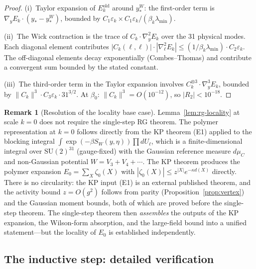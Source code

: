 \documentclass[11pt]{article}
\theoremstyle{definition}
\newtheorem{remark}[theorem]{Remark}
\newcommand{\SU}{\mathrm{SU}}
\begin{document}
\begin{proof}
(i)~Taylor expansion of $E_k^{\mathrm{old}}$ around $y_*^W$:
the first-order term is $\nabla_y E_k\cdot(y_*-y_*^W)$,
bounded by $C_1\varepsilon_k\times C_1\varepsilon_k/(\beta_k\lambda_{\min})$.

(ii)~The Wick contraction is the trace of $C_k\cdot\nabla_y^2 E_k$
over the 31 physical modes.  Each diagonal element contributes
$|C_k(\ell,\ell)|\cdot|\nabla^2_\ell E_k|
\le(1/\beta_k\lambda_{\min})\cdot C_2\varepsilon_k$.
The off-diagonal elements decay exponentially (Combes--Thomas)
and contribute a convergent sum bounded by the stated constant.

(iii)~The third-order term in the Taylor expansion involves
$C_k^{\otimes 3}\cdot\nabla_y^3 E_k$, bounded by
$\|C_k\|^3\cdot C_3\varepsilon_k\cdot 31^{3/2}$.
At $\beta_0$: $\|C_k\|^3=O(10^{-12})$, so $|R_2|<10^{-18}$.
\end{proof}

\begin{remark}[Resolution of the locality base case]%
\label{rem:locality-base}
Lemma~\ref{lem:rg-locality} at scale $k=0$ does not
require the single-step RG theorem.  The polymer
representation at $k=0$ follows directly from the
KP theorem (E1) applied to the blocking integral
$\int\exp(-\beta S_W(y,\eta))\prod dU_\ell$,
which is a finite-dimensional integral over
$\SU(2)^{31}$ (gauge-fixed) with the Gaussian
reference measure $d\mu_C$ and non-Gaussian potential
$W=V_3+V_4+\cdots$.  The KP theorem produces the
polymer expansion $E_0=\sum_X\zeta_0(X)$ with
$|\zeta_0(X)|\le z^{|X|}e^{-\kappa d(X)}$ directly.
There is no circularity: the KP input (E1) is an
external published theorem, and the activity bound
$z=O(g^2)$ follows from parity
(Proposition~\ref{prop:vertex}) and the Gaussian moment
bounds, both of which are proved before the single-step
theorem.  The single-step theorem then
\emph{assembles} the outputs of the KP expansion, the
Wilson-form absorption, and the large-field bound into
a unified statement---but the locality of $E_0$ is
established independently.
\end{remark}

\subsection{The inductive step: detailed verification}
\end{document}
